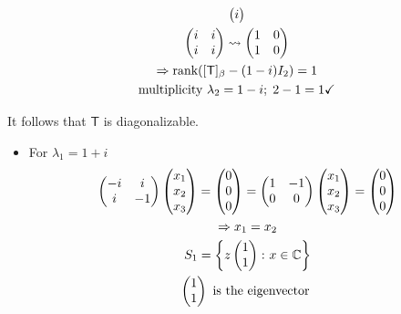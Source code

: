 \begin{enumerate}
\begin{itemize}
\begin{gather}
\begin{pmatrix}
  i\end{pmatrix}\\
\begin{pmatrix}
 i & i \\
 i & i
\end{pmatrix}
\leadsto
\begin{pmatrix}
1 & 0\\
1 & 0 
\end{pmatrix}\\
\implies \rank{[\mathsf{T}]_\beta-(1-i)I_2}=1\\
\text{multiplicity } \lambda_2 =1-i; \; 2-1 =1 \checkmark\\
\end{gather}
\end{itemize}
It follows that $\mathsf{T}$ is diagonalizable.
\begin{itemize}
\item For $\lambda_1 = 1 +i$
\begin{gather}
\begin{pmatrix}
-i & i\\
i & -1
\end{pmatrix}
\begin{pmatrix}
x_1\\x_2\\x_3
\end{pmatrix}
=
\begin{pmatrix}
0\\0\\0
\end{pmatrix}
=
\begin{pmatrix}
1 & -1\\
0 & 0
\end{pmatrix}
\begin{pmatrix}
x_1\\x_2\\x_3
\end{pmatrix}
=
\begin{pmatrix}
0\\0\\0
\end{pmatrix}\\
\implies x_1 = x_2\\
S_1 = \left\{z\begin{pmatrix}1\\1\end{pmatrix}\colon x \in
  \mathbb{C}\right\}\\
\notag \begin{pmatrix}1\\1\end{pmatrix} \text{ is the eigenvector
}
\end{gather}
\end{itemize}
\end{enumerate}
